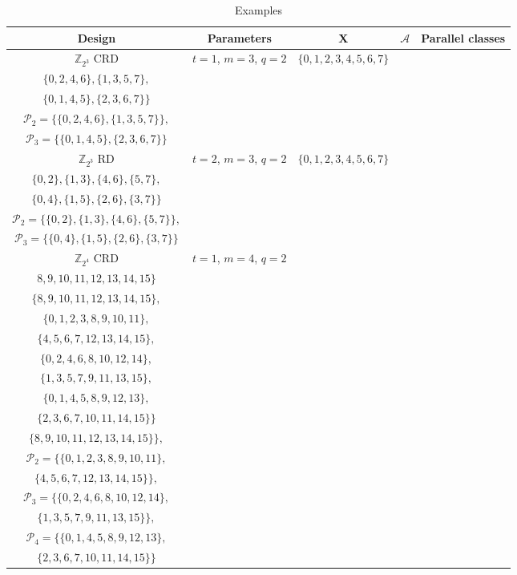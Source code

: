 \documentclass[conference]{IEEEtran}
\begin{document}
\begin{table*}[h]
	\caption{Examples}
	\begin{center}
		\renewcommand{\arraystretch}{2}
		\begin{tabular}{|c|c|c|c|c|}
			\hline
			\textbf{Design} &\textbf{Parameters}  &  X & $\mathcal{A}$ &\textbf{Parallel classes}\\\hline\hline	
			$\mathbb{Z}_{2^3}$ CRD & $t = 1$, $m = 3$, $q = 2$ & 	$\{ 0, 1, 2, 3, 4, 5, 6, 7\}$ &  \makecell{$\{\{0, 1, 2, 3\},\{4, 5, 6, 7\},$\\
				$\{0, 2, 4, 6\},\{1, 3, 5, 7\},$\\
				$\{0, 1, 4, 5\},\{2, 3, 6, 7\}\}$ 
			}& \makecell{$\mathcal{P}_1 = \{\{\{0, 1, 2, 3\},\{4, 5, 6, 7\}\},$\\$\mathcal{P}_2 = \{ \{0, 2, 4, 6\},\{1, 3, 5, 7\}\},$\\$\mathcal{P}_3 = \{\{0, 1, 4, 5\},\{2, 3, 6, 7\}\}$}\\
			\hline
			$\mathbb{Z}_{2^3}$ RD & $t = 2$, $m = 3$, $q = 2$ & 	$\{ 0, 1, 2, 3, 4, 5, 6, 7\}$ &  \makecell{$\{\{0,1\},\{2,3\},\{4,5\},\{6,7\},$ \\
				$\{0,2\},\{1,3\},\{4,6\},\{5,7\},$ \\
				$\{0,4\},\{1,5\},\{2,6\},\{3,7\}\}$}& \makecell{ $\mathcal{P}_1 = \{\{0,1\},\{2,3\},\{4,5\},\{6,7\}\},$\\
				$\mathcal{P}_2 = \{ \{0,2\},\{1,3\},\{4,6\},\{5,7\}\},$\\ $\mathcal{P}_3 = \{\{0,4\},\{1,5\},\{2,6\},\{3,7\}\}$}\\
			\hline
			$\mathbb{Z}_{2^4}$ CRD & $t = 1$, $m = 4$, $q = 2$ & \makecell{	$\{ 0, 1, 2, 3, 4, 5, 6, 7,$\\
				$ 8, 9, 10, 11, 12, 13, 14, 15\}$} &  \makecell{$\{\{0,1,2,3,4,5,6,7\},$\\$\{8,9,10,11,12,13,14,15\},$\\
				$\{0,1,2,3,8,9,10,11\},$\\$\{4,5,6,7,12,13,14,15\},$\\
				$\{0,2,4,6,8,10,12,14\},$\\$\{1,3,5,7,9,11,13,15\},$\\
				$\{0,1,4,5,8,9,12,13\},$\\$\{2,3,6,7,10,11,14,15\}\}$}& \makecell{ $\mathcal{P}_1 = \{\{0,1,2,3,4,5,6,7\},$\\$\{8,9,10,11,12,13,14,15\}\},$\\
				$\mathcal{P}_2 = \{ \{0,1,2,3,8,9,10,11\},$\\$\{4,5,6,7,12,13,14,15\}\},$\\ $\mathcal{P}_3 = \{\{0,2,4,6,8,10,12,14\},$\\$\{1,3,5,7,9,11,13,15\}\},$\\	
				$\mathcal{P}_4 = \{\{0,1,4,5,8,9,12,13\},$\\$\{2,3,6,7,10,11,14,15\}\}$}\\
			\hline
			

\end{tabular}
\end{center}
\end{table*}
\end{document}
